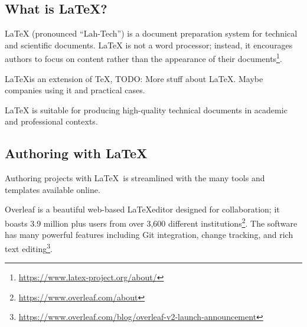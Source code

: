 
\subsection{What is \LaTeX?}
LaTeX (pronounced \enquote{Lah-Tech}) is a document preparation system for technical and scientiﬁc documents. LaTeX is not a word processor; instead, it encourages authors to focus on content rather than the appearance of their documents\footnote{\url{https://www.latex-project.org/about/}}. 

\begin{minipage}{\linewidth}
\end{minipage}

\LaTeX is an extension of \TeX, TODO: More stuff about LaTeX. Maybe companies using it and practical cases.

LaTeX is suitable for producing high-quality technical documents in academic and professional contexts.

\subsection{Authoring with \LaTeX}
Authoring projects with \LaTeX\ is streamlined with the many tools and templates available online.
\par
Overleaf is a beautiful web-based \LaTeX editor designed for collaboration; it boasts 3.9 million plus users from over 3,600 diﬀerent institutions\footnote{\url{https://www.overleaf.com/about}}.
The software has many powerful features including Git integration, change tracking, and rich text editing\footnote{\url{https://www.overleaf.com/blog/overleaf-v2-launch-announcement}}.

